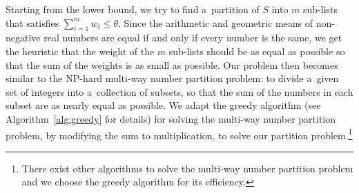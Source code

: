 \documentclass[runningheads,a4paper]{llncs}
\begin{document}
Starting from the lower bound, we try to find a~partition of $S$ into $m$ sub-lists that satisfies $\sum_{i=1}^{m}w_i \leq \theta$.
Since the arithmetic and geometric means of non-negative real numbers
are equal if and only if every number is the same,
we get the heuristic that the weight of the $m$ sub-lists should be as equal as possible
so that the sum of the weights is as small as possible.
Our problem then becomes similar to the NP-hard multi-way number partition problem:
to divide a~given set of integers into a~collection of subsets,
so that the sum of the numbers in each subset are as nearly equal as possible.
We adapt the greedy algorithm (see Algorithm~\ref{alg:greedy} for details)
for solving the multi-way number partition problem,
by modifying the sum to multiplication, to solve our partition problem.\footnote{
There exist other algorithms to solve the multi-way number partition problem and we choose the
greedy algorithm for its efficiency.}
%
\end{document}
